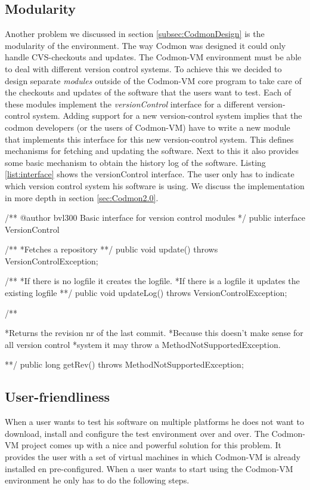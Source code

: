 \documentclass{article}
\newcommand{\project}{Codmon-VM}
\begin{document}
\subsection{Modularity}
\label{road:modular}
Another problem we discussed in section \ref{subsec:CodmonDesign} is the modularity of the environment. The way Codmon was designed it could only handle CVS-checkouts and updates. The \project{} 
environment must be able to deal with different version control systems. To achieve this we decided to design separate \emph{modules} outside of the \project{} core program to take care of the checkouts and updates of the 
software that the users want to test. Each of these modules implement the \emph{versionControl} interface for a different version-control system. Adding support for a new version-control system implies that the codmon developers 
(or the users of \project{}) have to write a new module that implements this interface for this new version-control system. This defines mechanisms for fetching and updating the software. Next to this it 
also provides some basic mechanism to obtain the history log of the software. Listing \ref{list:interface} shows the versionControl interface. The user only has to indicate which version control system his 
software is using. We discuss the implementation in more depth in section \ref{sec:Codmon2.0}.\\

\begin{code}[frame=shadowbox, language=Java,showstringspaces=false]
/**
@author bvl300 
Basic interface for version control modules
*/
public interface VersionControl{
	
	/**
	*Fetches a repository
	**/
	public void update() throws VersionControlException;
	
	/**
	*If there is no logfile it creates the logfile. 
	*If there is a logfile it updates the existing logfile
	**/
	public void updateLog() throws VersionControlException;


	/**

	*Returns the revision nr of the last commit.
	*Because this doesn't make sense for all version control
	*system it may throw a MethodNotSupportedException.

	**/
	public long getRev() throws MethodNotSupportedException;
}
\end{code}


\subsection{User-friendliness}
\label{road:user}
When a user wants to test his software on multiple platforms he does not want to download, install and configure the test environment over and over. The \project{} project comes up with a nice and powerful 
solution for this problem. It provides the user with a set of virtual machines in which \project{} is already installed en pre-configured. When a user wants to start using the \project{} environment he only 
has to do the following steps.
\end{document}
